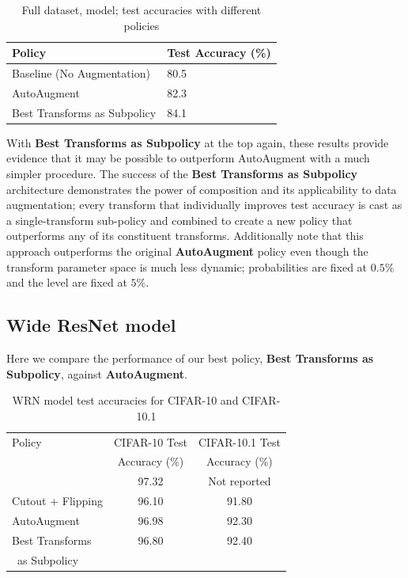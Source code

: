 \documentclass[10pt,twocolumn,letterpaper]{article}
\begin{document}
    \begin{table}[h]
    \begin{tabular}{l|l}
    \hline
    Policy                          &Test Accuracy (\%)   \\ \hline
    Baseline (No Augmentation)      &80.5 \\
    AutoAugment                     &82.3 \\
    Best Transforms as Subpolicy    &84.1 \\
    \end{tabular}
    \caption{Full dataset, model; test accuracies with different policies}
    \end{table}

    With \textbf{Best Transforms as Subpolicy} at the top again, these results provide evidence that it may be possible to outperform AutoAugment with a much simpler procedure. The success of the \textbf{Best Transforms as Subpolicy} architecture demonstrates the power of composition and its applicability to data augmentation; every transform that individually improves test accuracy is cast as a single-transform sub-policy and combined to create a new policy that outperforms any of its constituent transforms. Additionally note that this approach outperforms the original \textbf{AutoAugment} policy even though the transform parameter space is much less dynamic; probabilities are fixed at $0.5\%$ and the level are fixed at $5\%$.

  \subsection{Wide ResNet model}

    Here we compare the performance of our best policy, \textbf{Best Transforms as Subpolicy}, against \textbf{AutoAugment}.

    \begin{table}[h]
      \begin{tabular}{l|c|c}
        \hline
        Policy  &CIFAR-10 Test  &CIFAR-10.1 Test  \\
                &Accuracy (\%)  &Accuracy (\%) \\ \hline
        \cite{Cubuk2018} & 97.32 & Not reported \\
        Cutout + Flipping                 & 96.10 & 91.80 \\
        AutoAugment			        & 96.98 & 92.30 \\
        Best Transforms 			&96.80	&92.40 \\
        \, as Subpolicy			    &		&	 \\
        
      \end{tabular}
      \caption{WRN model \cite{Zagoruyko2016} test accuracies for CIFAR-10 and CIFAR-10.1}
    \end{table}
\end{document}
